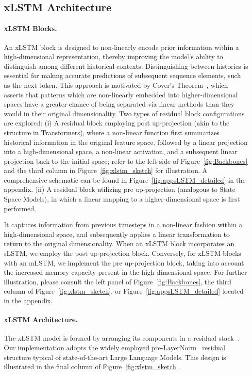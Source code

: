 \subsection{xLSTM Architecture}
\label{sec:xLSTMarch}

\paragraph{xLSTM Blocks.}
\label{sec:xLSTMblock}
An xLSTM block is designed to non-linearly encode prior information within a high-dimensional representation, thereby improving the model’s ability to distinguish among different historical contexts. Distinguishing between histories is essential for making accurate predictions of subsequent sequence elements, such as the next token. This approach is motivated by Cover’s Theorem~\citep{Cover:65}, which asserts that patterns which are non-linearly embedded into higher-dimensional spaces have a greater chance of being separated via linear methods than they would in their original dimensionality. Two types of residual block configurations are explored: (i) A residual block employing post up-projection (akin to the structure in Transformers), where a non-linear function first summarizes historical information in the original feature space, followed by a linear projection into a high-dimensional space, a non-linear activation, and a subsequent linear projection back to the initial space; refer to the left side of Figure~\ref{fig:Backbones}
and the third column in Figure~\ref{fig:xlstm_sketch} for illustration.
A comprehensive schematic can be found in Figure~\ref{fig:appsLSTM_detailed}
in the appendix. (ii) A residual block utilizing pre up-projection (analogous to State Space Models), in which a linear mapping to a higher-dimensional space is first performed,

It captures information from previous timesteps in a non-linear fashion within a high-dimensional space, and subsequently applies a linear transformation to return to the original dimensionality. When an xLSTM block incorporates an sLSTM, we employ the post up-projection block. Conversely, for xLSTM blocks with an mLSTM, we implement the pre up-projection block, taking into account the increased memory capacity present in the high-dimensional space. For further illustration, please consult the left panel of Figure~\ref{fig:Backbones}, the third column of Figure~\ref{fig:xlstm_sketch}, or Figure~\ref{fig:appsLSTM_detailed} located in the appendix.

\paragraph{xLSTM Architecture. }
\label{sec:xLSTMarchitecure}
The xLSTM model is formed by arranging its components in a residual stack~\citep{Srivastava:15,He:16}. Our implementation adopts the widely employed pre-LayerNorm~\citep{Ba:16b} residual structure typical of state-of-the-art Large Language Models. This design is illustrated in the final column of Figure~\ref{fig:xlstm_sketch}.

